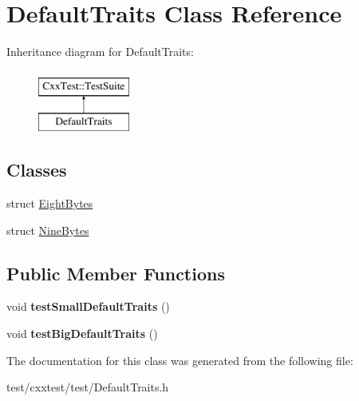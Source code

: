 \hypertarget{classDefaultTraits}{\section{Default\-Traits Class Reference}
\label{classDefaultTraits}
}
Inheritance diagram for Default\-Traits\-:\begin{figure}[H]
\begin{center}
\leavevmode
\includegraphics[height=2.000000cm]{classDefaultTraits}
\end{center}
\end{figure}
\subsection*{Classes}
\begin{DoxyCompactItemize}
\item 
struct \hyperlink{structDefaultTraits_1_1EightBytes}{Eight\-Bytes}
\item 
struct \hyperlink{structDefaultTraits_1_1NineBytes}{Nine\-Bytes}
\end{DoxyCompactItemize}
\subsection*{Public Member Functions}
\begin{DoxyCompactItemize}
\item 
\hypertarget{classDefaultTraits_a76287fe5397b049ce612c26bc16c82c9}{void {\bfseries test\-Small\-Default\-Traits} ()}\label{classDefaultTraits_a76287fe5397b049ce612c26bc16c82c9}

\item 
\hypertarget{classDefaultTraits_a12ed3f933bf5df4433ad173fb956f75b}{void {\bfseries test\-Big\-Default\-Traits} ()}\label{classDefaultTraits_a12ed3f933bf5df4433ad173fb956f75b}

\end{DoxyCompactItemize}


The documentation for this class was generated from the following file\-:\begin{DoxyCompactItemize}
\item 
test/cxxtest/test/Default\-Traits.\-h\end{DoxyCompactItemize}
